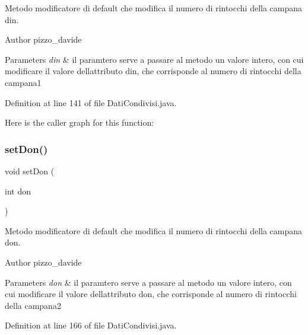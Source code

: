 Metodo modificatore di default che modifica il numero di rintocchi della campana \textquotesingle{}din\textquotesingle{}. 

\begin{DoxyAuthor}{Author}
pizzo\+\_\+davide
\end{DoxyAuthor}

\begin{DoxyParams}{Parameters}
{\em din} & il paramtero serve a passare al metodo un valore intero, con cui modificare il valore dell\textquotesingle{}attributo din, che corrisponde al numero di rintocchi della campana1 \\
\hline
\end{DoxyParams}


Definition at line 141 of file Dati\+Condivisi.\+java.

Here is the caller graph for this function\+:
\mbox{\label{classcampane_1_1_dati_condivisi_a423462972930fdb769f394b1693b3415}} 
\subsubsection{\texorpdfstring{set\+Don()}{setDon()}}
{\footnotesize\ttfamily void set\+Don (\begin{DoxyParamCaption}\item[{int}]{don }\end{DoxyParamCaption})}



Metodo modificatore di default che modifica il numero di rintocchi della campana \textquotesingle{}don\textquotesingle{}. 

\begin{DoxyAuthor}{Author}
pizzo\+\_\+davide
\end{DoxyAuthor}

\begin{DoxyParams}{Parameters}
{\em don} & il paramtero serve a passare al metodo un valore intero, con cui modificare il valore dell\textquotesingle{}attributo don, che corrisponde al numero di rintocchi della campana2 \\
\hline
\end{DoxyParams}


Definition at line 166 of file Dati\+Condivisi.\+java.

